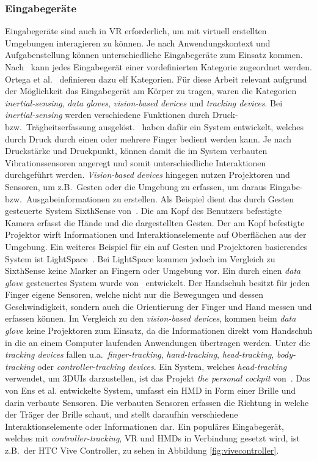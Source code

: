\subsubsection{Eingabegeräte}
Eingabegeräte sind auch in VR erforderlich, um mit virtuell erstellten Umgebungen interagieren zu können. Je nach Anwendungskontext und Aufgabenstellung können unterschiedliche Eingabegeräte zum Einsatz kommen. 
Nach~\cite{modernworldinputdevices} kann jedes Eingabegerät einer vordefinierten Kategorie zugeordnet werden. Ortega et al.~ definieren dazu elf Kategorien. Für diese Arbeit relevant aufgrund der Möglichkeit das Eingabegerät am Körper zu tragen, waren die Kategorien \textit{inertial-sensing}, \textit{data gloves}, \textit{vision-based devices} und \textit{tracking devices}. Bei
\textit{inertial-sensing} werden verschiedene Funktionen durch Druck- bzw.~Trägheitserfassung ausgelöst.~\cite{skinput} haben dafür ein System entwickelt, welches durch Druck durch einen oder mehrere Finger bedient werden kann. Je nach Druckstärke und Druckpunkt, können damit die im System verbauten Vibrationssensoren angeregt und somit unterschiedliche Interaktionen durchgeführt werden. \textit{Vision-based devices} hingegen nutzen Projektoren und Sensoren, um z.B.~Gesten oder die Umgebung zu erfassen, um daraus Eingabe- bzw.~Ausgabeinformationen zu erstellen. Als Beispiel dient das durch Gesten gesteuerte System SixthSense von~\cite{sixthsense}. Die am Kopf des Benutzers befestigte Kamera erfasst die Hände und die dargestellten Gesten. Der am Kopf befestigte Projektor wirft Informationen und Interaktionselemente auf Oberflächen aus der Umgebung. Ein weiteres Beispiel für ein auf Gesten und Projektoren basierendes System ist LightSpace~\cite{lightspace}. Bei LightSpace kommen jedoch im Vergleich zu SixthSense keine Marker an Fingern oder Umgebung vor. Ein durch einen \textit{data glove} gesteuertes System wurde von~\cite{dataglove} entwickelt. Der Handschuh besitzt für jeden Finger eigene Sensoren, welche nicht nur die Bewegungen und dessen Geschwindigkeit, sondern auch die Orientierung der Finger und Hand messen und erfassen können. Im Vergleich zu den \textit{vision-based devices}, kommen beim \textit{data glove} keine Projektoren zum Einsatz, da die Informationen direkt vom Handschuh in die an einem Computer laufenden Anwendungen übertragen werden. Unter die \textit{tracking devices} fallen u.a.~\textit{finger-tracking}, \textit{hand-tracking}, \textit{head-tracking}, \textit{body-tracking} oder \textit{controller-tracking devices}. Ein System, welches \textit{head-tracking} verwendet, um 3DUIs darzustellen, ist das Projekt \textit{the personal cockpit} von~\cite{thepersonalcockpit}. Das von Ens et al. entwickelte System, umfasst ein HMD in Form einer Brille und darin verbaute Sensoren. Die verbauten Sensoren erfassen die Richtung in welche der Träger der Brille schaut, und stellt daraufhin verschiedene Interaktionselemente oder Informationen dar. Ein populäres Eingabegerät, welches mit \textit{controller-tracking}, VR und HMDs in Verbindung gesetzt wird, ist z.B.~der HTC Vive Controller, zu sehen in Abbildung \ref{fig:vivecontroller}.

